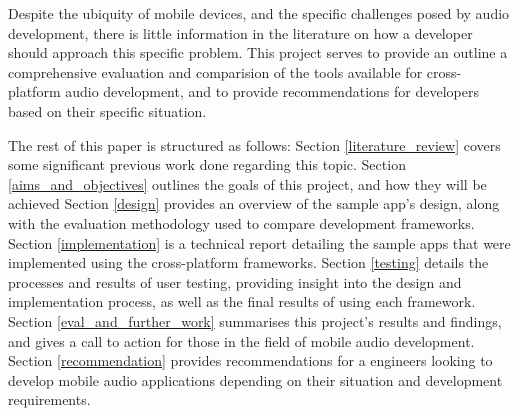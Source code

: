 Despite the ubiquity of mobile devices, and the specific challenges posed by audio development, there is little information in the literature on how a developer should approach this specific problem.
This project serves to provide an outline a comprehensive evaluation and comparision of the tools available for cross-platform audio development, and to provide recommendations for developers based on their specific situation.

The rest of this paper is structured as follows: Section \ref{literature_review} covers some significant previous work done regarding this topic. %
Section \ref{aims_and_objectives} outlines the goals of this project, and how they will be achieved
Section \ref{design} provides an overview of the sample app's design, along with the evaluation methodology used to compare development frameworks. 
Section \ref{implementation} is a technical report detailing the sample apps that were implemented using the cross-platform frameworks. Section \ref{testing} details the processes and results of user testing, providing insight into the design and implementation process, as well as the final results of using each framework. %
Section \ref{eval_and_further_work} summarises this project's results and findings, and gives a call to action for those in the field of mobile audio development.
Section \ref{recommendation} provides recommendations for a engineers looking to develop mobile audio applications depending on their situation and development requirements.
